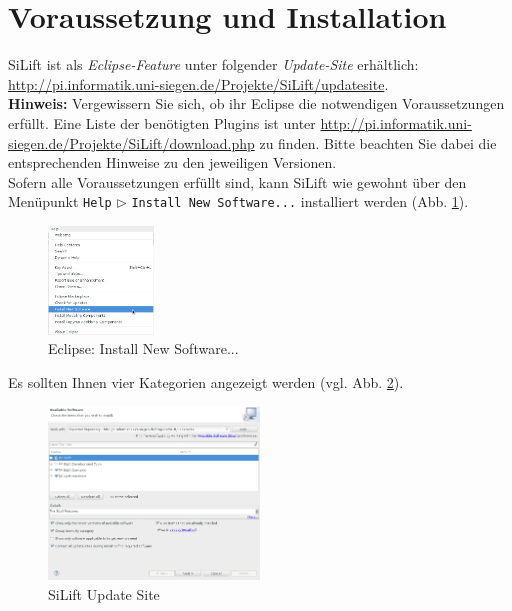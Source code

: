 \section{Voraussetzung und Installation}

SiLift ist als \textit{Eclipse-Feature} unter folgender \textit{Update-Site} erhältlich:\\ \url{http://pi.informatik.uni-siegen.de/Projekte/SiLift/updatesite}.\\

\textbf{Hinweis:} Vergewissern Sie sich, ob ihr Eclipse die notwendigen Voraussetzungen erfüllt. 
Eine Liste der benötigten Plugins ist unter \url{http://pi.informatik.uni-siegen.de/Projekte/SiLift/download.php} zu finden.
Bitte beachten Sie dabei die entsprechenden Hinweise zu den jeweiligen Versionen.\\

Sofern alle Voraussetzungen erfüllt sind, kann SiLift wie gewohnt über den Menüpunkt \texttt{Help} $\triangleright$ \texttt{Install New Software...} installiert werden (Abb. \ref{eclipse-install_new_software}).
\begin{figure}[H]
\centering
\includegraphics[width=0.25\textwidth]{requirements/graphics/eclipse-install_new_software.png}
\caption{Eclipse: Install New Software...}
\label{eclipse-install_new_software}
\end{figure}

Es sollten Ihnen vier Kategorien angezeigt werden (vgl. Abb. \ref{eclipse-install_silift}). 

\begin{figure}[H]
\centering
\includegraphics[width=0.5\textwidth]{requirements/graphics/eclipse-install_silift.png}
\caption{SiLift Update Site}
\label{eclipse-install_silift}
\end{figure}

